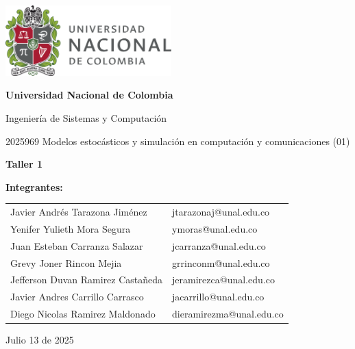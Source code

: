 \documentclass{article}
\begin{document}
\begin{titlepage}
    \centering
    \includegraphics[width=0.48\textwidth]{logo_universidad.png}
    \par\vspace{2cm}

    {\Large \textbf{Universidad Nacional de Colombia} \par}
    \vspace{0.5cm}
    {\large Ingeniería de Sistemas y Computación \par}
    {\large 2025969 Modelos estocásticos y simulación en computación y comunicaciones (01)\par}
    \vspace{3cm}

    {\large \textbf{Taller 1} \par}
    \vspace{3cm}

    {\large \textbf{Integrantes:} \par}
    \vspace{0.5cm}
    \begin{tabular}{ll}
    Javier Andrés Tarazona Jiménez & jtarazonaj@unal.edu.co \\
    Yenifer Yulieth Mora Segura & ymoras@unal.edu.co \\
    Juan Esteban Carranza Salazar & jcarranza@unal.edu.co \\
    Grevy Joner Rincon Mejia & grrinconm@unal.edu.co \\
    Jefferson Duvan Ramirez Castañeda & jeramirezca@unal.edu.co \\
    Javier Andres Carrillo Carrasco & jacarrillo@unal.edu.co \\
    Diego Nicolas Ramirez Maldonado & dieramirezma@unal.edu.co \\
    \end{tabular}
    \par\vspace{3cm}

    {\large Julio 13 de 2025 \par}
\end{titlepage}
\end{document}
